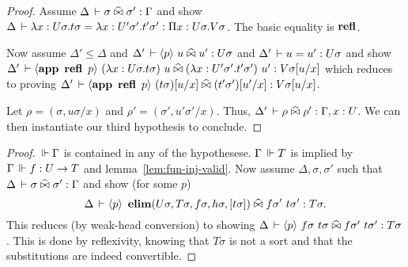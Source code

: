 \documentclass[a4paper,english]{lipics-utf8x}
\begin{document}
  \begin{proof}
    Assume $\Delta \,\vdash \sigma \mathrel{\widehat{\bowtie}} \sigma' : \Gamma$ and show
    $\Delta \,\vdash \lambda x:U\sigma.t\sigma = \lambda x:U'\sigma'.t'\sigma' :
    \Pi x:U\sigma.V\sigma$.
    The basic equality is $\operatorname{\mathbf{refl}}$.

    Now assume $\Delta' \le \Delta$ and
    $\Delta' \,\vdash \langle p \rangle~ u \mathrel{\widehat{\bowtie}} u' : U\sigma$ and
    $\Delta' \,\vdash u = u' : U \sigma$
    and show $\Delta' \,\vdash \langle \operatorname{\mathbf{app}~} \operatorname{\mathbf{refl}}\ p \rangle~
    (\lambda x:U\sigma.t\sigma)\ u \mathrel{\widehat{\bowtie}}
    (\lambda x:U'\sigma'.t'\sigma')\ u' :
    V\sigma[u/x]$ which reduces to proving
    $\Delta' \,\vdash \langle \operatorname{\mathbf{app}~} \operatorname{\mathbf{refl}}\ p \rangle~
    (t\sigma)[u/x] \mathrel{\widehat{\bowtie}} (t'\sigma')[u'/x] : V\sigma[u/x]$.

    Let $\rho = (\sigma, u\sigma / x)$ and $\rho' = (\sigma', u'\sigma' / x)$.
    Thus, $\Delta' \,\vdash \rho \mathrel{\widehat{\bowtie}} \rho' : \Gamma, x:U$.
    We can then instantiate our third hypothesis to conclude.
  \end{proof}

  \begin{lemma}
    \leavevmode
    \begin{mathc}
    \end{mathc}
  \end{lemma}

  \begin{proof}
    $\,\Vdash \Gamma$ is contained in any of the hypothesese.
    $\Gamma \,\Vdash T$ is implied by $\Gamma \,\Vdash f : U \to T$ and
    lemma~\ref{lem:fun-inj-valid}.
    Now assume $\Delta, \sigma, \sigma'$ such that
    $\Delta \,\vdash \sigma \mathrel{\widehat{\bowtie}} \sigma' : \Gamma$ and
    show (for some $p$)
    \[\Delta \,\vdash \langle p \rangle~
    \operatorname{\mathbf{elim}}(U \sigma,T \sigma,f \sigma,h \sigma,[t \sigma]) \mathrel{\widehat{\bowtie}}
    f \sigma'\ t \sigma' : T \sigma.\]
    This reduces (by weak-head conversion) to showing
    $\Delta \,\vdash \langle p \rangle~
    f \sigma\ t \sigma \mathrel{\widehat{\bowtie}}
    f \sigma'\ t \sigma' : T \sigma$.
    This is done by reflexivity, knowing that $T \sigma$ is not a sort
    and that the substitutions are indeed convertible.
  \end{proof}

  \begin{lemma}
    \leavevmode
    \begin{mathc}
    \end{mathc}
  \end{lemma}
\end{document}

